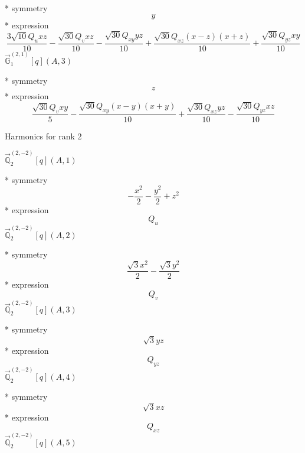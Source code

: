 \documentclass[fleqn,8pt]{jsarticle}
\begin{document}
\noindent\quad ** symmetry
\begin{dmath*}
y
\end{dmath*}
\noindent\quad ** expression
\begin{dmath*}
\frac{3 \sqrt{10} Q_{u} x z}{10} - \frac{\sqrt{30} Q_{v} x z}{10} - \frac{\sqrt{30} Q_{xy} y z}{10} + \frac{\sqrt{30} Q_{xz} \left(x - z\right) \left(x + z\right)}{10} + \frac{\sqrt{30} Q_{yz} x y}{10}
\end{dmath*}
\noindent\quad $\vec{\mathbb{G}}_{1}^{(2,1)}[q](A,3)$

\noindent\quad ** symmetry
\begin{dmath*}
z
\end{dmath*}
\noindent\quad ** expression
\begin{dmath*}
\frac{\sqrt{30} Q_{v} x y}{5} - \frac{\sqrt{30} Q_{xy} \left(x - y\right) \left(x + y\right)}{10} + \frac{\sqrt{30} Q_{xz} y z}{10} - \frac{\sqrt{30} Q_{yz} x z}{10}
\end{dmath*}

\noindent * Harmonics for rank 2

\noindent\quad $\vec{\mathbb{Q}}_{2}^{(2,-2)}[q](A,1)$

\noindent\quad ** symmetry
\begin{dmath*}
- \frac{x^{2}}{2} - \frac{y^{2}}{2} + z^{2}
\end{dmath*}
\noindent\quad ** expression
\begin{dmath*}
Q_{u}
\end{dmath*}
\noindent\quad $\vec{\mathbb{Q}}_{2}^{(2,-2)}[q](A,2)$

\noindent\quad ** symmetry
\begin{dmath*}
\frac{\sqrt{3} x^{2}}{2} - \frac{\sqrt{3} y^{2}}{2}
\end{dmath*}
\noindent\quad ** expression
\begin{dmath*}
Q_{v}
\end{dmath*}
\noindent\quad $\vec{\mathbb{Q}}_{2}^{(2,-2)}[q](A,3)$

\noindent\quad ** symmetry
\begin{dmath*}
\sqrt{3} y z
\end{dmath*}
\noindent\quad ** expression
\begin{dmath*}
Q_{yz}
\end{dmath*}
\noindent\quad $\vec{\mathbb{Q}}_{2}^{(2,-2)}[q](A,4)$

\noindent\quad ** symmetry
\begin{dmath*}
\sqrt{3} x z
\end{dmath*}
\noindent\quad ** expression
\begin{dmath*}
Q_{xz}
\end{dmath*}
\noindent\quad $\vec{\mathbb{Q}}_{2}^{(2,-2)}[q](A,5)$
\end{document}
